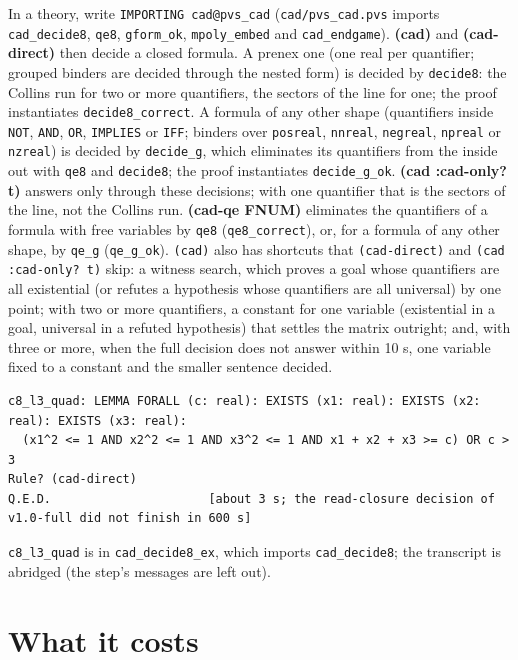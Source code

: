 \documentclass[11pt]{article}
\newcommand\cmdtag[1]{\colorbox{accentsoft}{\textcolor{accent}{\ttfamily\bfseries #1}}}
\begin{document}
{\raggedright In a theory, write \texttt{IMPORTING cad@pvs\_cad} (\texttt{cad/pvs\_cad.pvs} imports
\texttt{cad\_decide8}, \texttt{qe8}, \texttt{gform\_ok}, \texttt{mpoly\_embed} and \texttt{cad\_endgame}).
\cmdtag{(cad)} and \cmdtag{(cad-direct)} then decide a closed formula. A prenex one (one real per quantifier;
grouped binders are decided through the nested form) is decided by \texttt{decide8}: the Collins run for two or
more quantifiers, the sectors of the line for one; the proof instantiates \texttt{decide8\_correct}. A formula of
any other shape (quantifiers inside \texttt{NOT}, \texttt{AND}, \texttt{OR}, \texttt{IMPLIES} or \texttt{IFF};
binders over \texttt{posreal}, \texttt{nnreal}, \texttt{negreal}, \texttt{npreal} or \texttt{nzreal}) is decided by
\texttt{decide\_g}, which eliminates its quantifiers from the inside out with \texttt{qe8} and \texttt{decide8}; the
proof instantiates \texttt{decide\_g\_ok}. \cmdtag{(cad :cad-only? t)} answers only through these decisions; with
one quantifier that is the sectors of the line, not the Collins run. \cmdtag{(cad-qe FNUM)} eliminates the
quantifiers of a formula with free variables by \texttt{qe8} (\texttt{qe8\_correct}), or, for a formula of any
other shape, by \texttt{qe\_g} (\texttt{qe\_g\_ok}). \texttt{(cad)} also has shortcuts that \texttt{(cad-direct)}
and \texttt{(cad :cad-only? t)} skip: a witness search, which proves a goal whose quantifiers are all existential
(or refutes a hypothesis whose quantifiers are all universal) by one point; with two or more quantifiers, a constant
for one variable (existential in a goal, universal in a refuted hypothesis) that settles the matrix outright; and, with three or more, when the full decision
does not answer within 10 s, one variable fixed to a constant and the smaller sentence decided.\par}
\begin{termbox}
\begin{Verbatim}
c8_l3_quad: LEMMA FORALL (c: real): EXISTS (x1: real): EXISTS (x2: real): EXISTS (x3: real):
  (x1^2 <= 1 AND x2^2 <= 1 AND x3^2 <= 1 AND x1 + x2 + x3 >= c) OR c > 3
Rule? (cad-direct)
Q.E.D.                      [about 3 s; the read-closure decision of v1.0-full did not finish in 600 s]
\end{Verbatim}
\end{termbox}
{\small\color{muted} \texttt{c8\_l3\_quad} is in \texttt{cad\_decide8\_ex}, which imports \texttt{cad\_decide8};
the transcript is abridged (the step's messages are left out).}

\section{What it costs}
\end{document}
